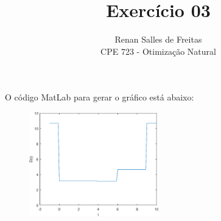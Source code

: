 \documentclass[12pt]{article}
\newenvironment{exercise}[2][Exercício]{\begin{trivlist}
\item[\hskip \labelsep {\bfseries #1}\hskip \labelsep {\bfseries #2.}]}{\end{trivlist}}
\begin{document}
 
 
\title{Exercício 03}
\author{Renan Salles de Freitas\\
CPE 723 - Otimização Natural}
 
\maketitle
 
\begin{exercise}{1.a}
O código MatLab para gerar o gráfico está abaixo:


\begin{figure}[H]
    \centering
    \includegraphics[width=0.5\textwidth]{figs/ex1a.eps}
\end{figure}
\end{exercise}
\end{document}
